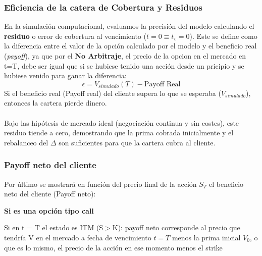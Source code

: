 \documentclass[11pt]{article}
\begin{document}
			\subsubsection{Eficiencia de la catera de Cobertura y Residuos}
				En la simulación computacional, evaluamos la precisión del modelo calculando el \textbf{residuo} o error de cobertura al vencimiento ($t=0 \equiv t_v = 0$). Este se define como la diferencia entre el valor de la opción calculado por el modelo y el beneficio real (\textit{payoff}), ya que por el \textbf{No Arbitraje}, el precio de la opcion en el mercado en t=T, debe ser igual que si se hubiese tenido una acción desde un pricipio y se hubiese venido para ganar la diferencia:
				\begin{equation}
					\epsilon = V_{simulado}(T) - \text{Payoff Real}
				\end{equation}
				Si el beneficio real (Payoff real) del cliente supera lo que se esperaba ($V_{simulado}$), entonces la cartera pierde dinero.\\
				\\
				Bajo las hipótesis de mercado ideal (negociación continua y sin costes), este residuo tiende a cero, demostrando que la prima cobrada inicialmente y el rebalanceo del $\Delta$ son suficientes para que la cartera cubra al cliente.
			
			\subsubsection{Payoff neto del cliente}
				Por último se mostrará en función del precio final de la acción $S_T$ el beneficio neto del cliente (Payoff neto):
			
				\textbf{Si es una opción tipo call}
			
				Si en t = T el estado es ITM (S$>$K): payoff neto corresponde al precio que tendría V en el mercado a fecha de vencimiento $t = T$ menos la prima inicial $V_0$, o que es lo mismo, el precio de la acción en ese momento menos el strike
			
\end{document}
